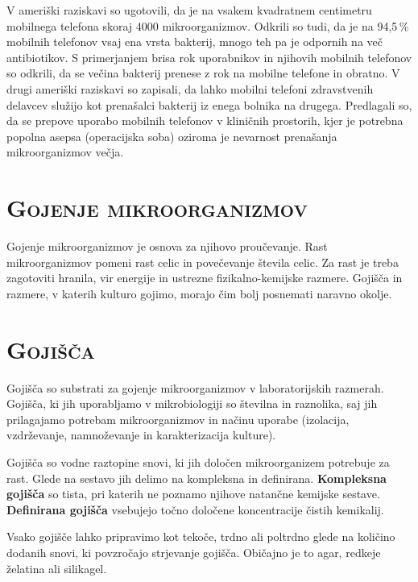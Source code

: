 \documentclass[12pt, a4paper, oneside]{report}
\begin{document}
V ameriški raziskavi so ugotovili, da je na vsakem kvadratnem centimetru mobilnega telefona skoraj 4000 mikroorganizmov. Odkrili so tudi, da je na 94,5\,\% mobilnih telefonov vsaj ena vrsta bakterij, mnogo teh pa je odpornih na več antibiotikov. S primerjanjem brisa rok uporabnikov in njihovih mobilnih telefonov so odkrili, da se večina bakterij prenese z rok na mobilne telefone in obratno. V drugi ameriški raziskavi so zapisali, da lahko mobilni telefoni zdravstvenih delavcev služijo kot prenašalci bakterij iz enega bolnika na drugega. Predlagali so, da se prepove uporabo mobilnih telefonov v kliničnih prostorih, kjer je potrebna popolna asepsa (operacijska soba) oziroma je nevarnost prenašanja mikroorganizmov večja.

\section{\textsc{Gojenje mikroorganizmov}}

Gojenje mikroorganizmov je osnova za njihovo proučevanje. Rast mikroorganizmov pomeni rast celic in povečevanje števila celic. Za rast je treba zagotoviti hranila, vir energije in ustrezne fizikalno-kemijske razmere. Gojišča in razmere, v katerih kulturo gojimo, morajo čim bolj posnemati naravno okolje.

\section{\textsc{Gojišča}}

Gojišča so substrati za gojenje mikroorganizmov v laboratorijskih razmerah. Gojišča, ki jih uporabljamo v mikrobiologiji so številna in raznolika, saj jih prilagajamo potrebam mikroorganizmov in načinu uporabe (izolacija, vzdrževanje, namnoževanje in karakterizacija kulture).

Gojišča so vodne raztopine snovi, ki jih določen mikroorganizem potrebuje za rast. Glede na sestavo jih delimo na kompleksna in definirana. \textbf{Kompleksna gojišča} so tista, pri katerih ne poznamo njihove natančne kemijske sestave. \textbf{Definirana gojišča} vsebujejo točno določene koncentracije čistih kemikalij.

Vsako gojišče lahko pripravimo kot tekoče, trdno ali poltrdno glede na količino dodanih snovi, ki povzročajo strjevanje gojišča. Običajno je to agar, redkeje želatina ali silikagel.
\end{document}
